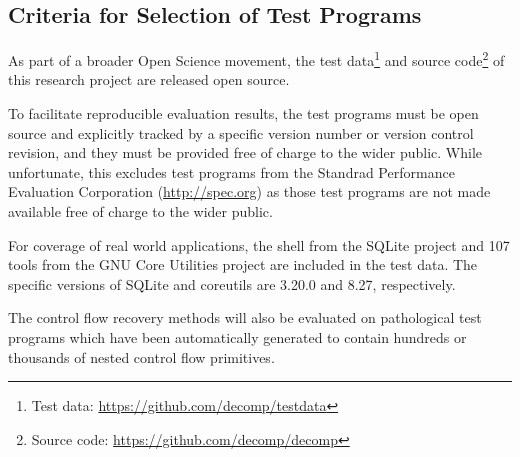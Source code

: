 
\subsection{Criteria for Selection of Test Programs}

As part of a broader Open Science movement, the test data\footnote{Test data: \url{https://github.com/decomp/testdata}} and source code\footnote{Source code: \url{https://github.com/decomp/decomp}} of this research project are released open source.

To facilitate reproducible evaluation results, the test programs must be open source and explicitly tracked by a specific version number or version control revision, and they must be provided free of charge to the wider public. While unfortunate, this excludes test programs from the Standrad Performance Evaluation Corporation (\url{http://spec.org}) as those test programs are not made available free of charge to the wider public.

For coverage of real world applications, the shell from the SQLite project and 107 tools from the GNU Core Utilities project are included in the test data. The specific versions of SQLite and coreutils are 3.20.0 and 8.27, respectively.

The control flow recovery methods will also be evaluated on pathological test programs which have been automatically generated to contain hundreds or thousands of nested control flow primitives.

